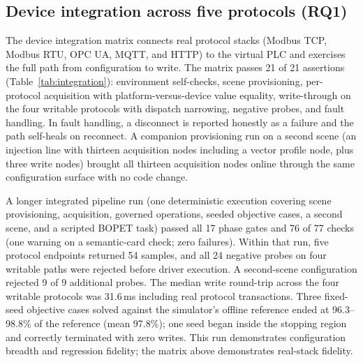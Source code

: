 \subsection{Device integration across five protocols (RQ1)}
\label{sec:eval-integration}

The device integration matrix connects real protocol stacks (Modbus
TCP, Modbus RTU, OPC UA, MQTT, and HTTP) to the virtual PLC and
exercises the full path from configuration to write. The matrix passes
21 of 21 assertions (Table~\ref{tab:integration}): environment
self-checks, scene provisioning, per-protocol acquisition with
platform-versus-device value equality, write-through on the four writable
protocols with dispatch narrowing, negative probes, and fault handling.
In fault handling, a disconnect is reported honestly as a failure and the
path self-heals on reconnect. A companion provisioning run on a second scene
(an injection line with thirteen acquisition nodes including a vector
profile node, plus three write nodes) brought all thirteen acquisition
nodes online through the same configuration surface with no code change.

A longer integrated pipeline run (one deterministic execution covering
scene provisioning, acquisition, governed operations, seeded objective
cases, a second scene, and a scripted BOPET task) passed all 17 phase
gates and 76 of 77 checks (one warning on a semantic-card check; zero
failures). Within that run, five protocol endpoints returned 54 samples,
and all 24 negative probes on four writable paths were rejected before
driver execution. A second-scene configuration rejected 9 of 9 additional
probes. The median write round-trip across the four writable protocols
was 31.6\,ms including real protocol transactions. Three
fixed-seed objective cases solved against the simulator's offline
reference ended at 96.3--98.8\% of the reference (mean 97.8\%); one seed
began inside the stopping region and correctly terminated with zero
writes. This run demonstrates configuration breadth and regression
fidelity; the matrix above demonstrates real-stack fidelity.

